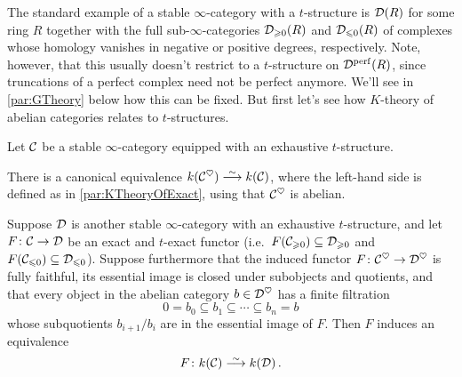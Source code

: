 \documentclass[a4paper, 10pt, oneside, DIV=9, chapterprefix=true, numbers=enddot,bibliography=totoc]{scrbook}
\newcommand{\embrace}[1]{\textup{(}#1\textup{)}}
\begin{document}
The standard example of a stable $\infty$-category with a $t$-structure is $\mathcal{D}(R)$ for some ring $R$ together with the full sub-$\infty$-categories $\mathcal{D}_{\geqslant 0}(R)$ and $\mathcal{D}_{\leqslant 0}(R)$ of complexes whose homology vanishes in negative or positive degrees, respectively. Note, however, that this usually doesn't restrict to a $t$-structure on $\mathcal{D}^{\mathrm{perf}}(R)$, since truncations of a perfect complex need not be perfect anymore. We'll see in \cref{par:GTheory} below how this can be fixed. But first let's see how $K$-theory of abelian categories relates to $t$-structures.
\begin{thm}\label{thm:BarwickHeart}
	Let $\mathcal{C}$ be a stable $\infty$-category equipped with an exhaustive $t$-structure.
	\begin{alphanumerate}
		\item There is a canonical equivalence $k(\Cc^\heartsuit)\isomorphism k(\Cc)$, where the left-hand side is defined as in \cref{par:KTheoryOfExact}, using that $\mathcal{C}^\heartsuit$ is abelian.
		\item Suppose $\mathcal{D}$ is another stable $\infty$-category with an exhaustive $t$-structure, and let $F\colon \Cc\morphism \Dd$ be an exact and $t$-exact functor \embrace{i.e.\ $F(\mathcal{C}_{\geqslant 0})\subseteq \mathcal{D}_{\geqslant 0}$ and $F(\mathcal{C}_{\leqslant 0})\subseteq \mathcal{D}_{\leqslant 0}$}. Suppose furthermore that the induced functor $F\colon \Cc^\heartsuit\morphism \Dd^\heartsuit$ is fully faithful, its essential image is closed under subobjects and quotients, and that every object in the abelian category $b\in \mathcal{D}^\heartsuit$ has a finite filtration
		\begin{equation*}
			0=b_0\subseteq b_1\subseteq \dotsb\subseteq b_n=b
		\end{equation*}
		whose subquotients $b_{i+1}/b_i$ are in the essential image of $F$. Then $F$ induces an equivalence
		\begin{equation*}
			F\colon k(\Cc)\isomorphism k(\Dd)\,.
		\end{equation*}
	\end{alphanumerate}
\end{thm}
\end{document}
